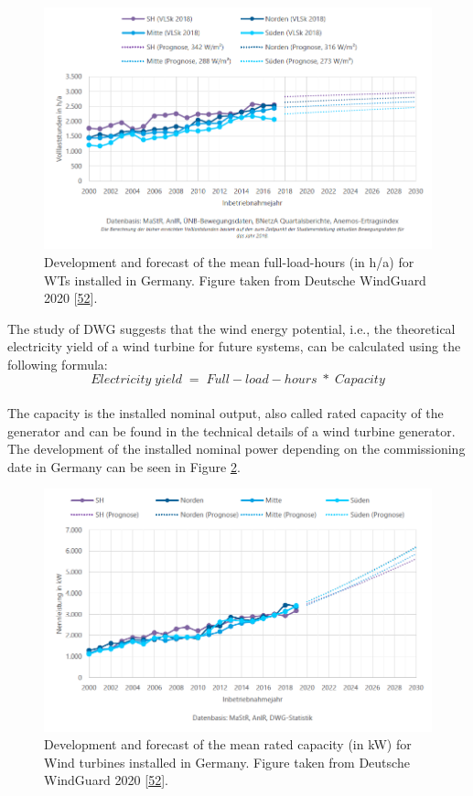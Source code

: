 \documentclass[a4paper,11pt]{article}
\begin{document}
\begin{figure}[H]

{\centering \includegraphics[width=1\linewidth]{figures/DWG/DWG_Volllaststunden} 

}

\caption{Development and forecast of the mean full-load-hours (in h/a) for WTs installed in Germany. Figure taken from Deutsche WindGuard 2020 {[}\protect\hyperlink{ref-RasmusBorrmannDr.KnudRehfeldtDr.DennisKruse.2020}{52}{]}.}\label{fig:flh}
\end{figure}
The study of DWG suggests that the wind energy potential, i.e., the theoretical electricity yield of a wind turbine for future systems, can be calculated using the following formula:
\[
Electricity\;yield\; =\; Full-load-hours\; *\; Capacity
\]\\
The capacity is the installed nominal output, also called rated capacity of the generator and can be found in the technical details of a wind turbine generator. The development of the installed nominal power depending on the commissioning date in Germany can be seen in Figure \ref{fig:capacity}.
\begin{figure}[H]

{\centering \includegraphics[width=1\linewidth]{figures/DWG/DWG_Nennleistung} 

}

\caption{Development and forecast of the mean rated capacity (in kW) for Wind turbines installed in Germany. Figure taken from Deutsche WindGuard 2020 {[}\protect\hyperlink{ref-RasmusBorrmannDr.KnudRehfeldtDr.DennisKruse.2020}{52}{]}.}\label{fig:capacity}
\end{figure}
\end{document}
